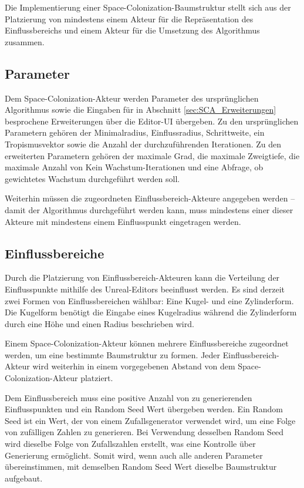 Die Implementierung einer Space-Colonization-Baumstruktur stellt sich aus der Platzierung von mindestens einem Akteur für die Repräsentation des Einflussbereichs und einem Akteur für die Umsetzung des Algorithmus zusammen.

\subsection{Parameter}

Dem Space-Colonization-Akteur werden Parameter des ursprünglichen Algorithmus sowie die Eingaben für in Abschnitt \ref{sec:SCA_Erweiterungen} besprochene Erweiterungen über die Editor-UI übergeben. Zu den ursprünglichen Parametern gehören der Minimalradius, Einflussradius, Schrittweite, ein Tropismusvektor sowie die Anzahl der durchzuführenden Iterationen. Zu den erweiterten Parametern gehören der maximale Grad, die maximale Zweigtiefe, die maximale Anzahl von \glqq Kein Wachstum\grqq{}-Iterationen und eine Abfrage, ob gewichtetes Wachstum durchgeführt werden soll.

Weiterhin müssen die zugeordneten Einflussbereich-Akteure angegeben werden -- damit der Algorithmus durchgeführt werden kann, muss mindestens einer dieser Akteure mit mindestens einem Einflusspunkt eingetragen werden.

\subsection{Einflussbereiche}

Durch die Platzierung von Einflussbereich-Akteuren kann die Verteilung der Einflusspunkte mithilfe des Unreal-Editors beeinflusst werden. Es sind derzeit zwei Formen von Einflussbereichen wählbar: Eine Kugel- und eine Zylinderform. Die Kugelform benötigt die Eingabe eines Kugelradius während die Zylinderform durch eine Höhe und einen Radius beschrieben wird. 

Einem Space-Colonization-Akteur können mehrere Einflussbereiche zugeordnet werden, um eine bestimmte Baumstruktur zu formen. Jeder Einflussbereich-Akteur wird weiterhin in einem vorgegebenen Abstand von dem Space-Colonization-Akteur platziert.

Dem Einflussbereich muss eine positive Anzahl von zu generierenden Einflusspunkten und ein Random Seed Wert übergeben werden. Ein Random Seed ist ein Wert, der von einem Zufallsgenerator verwendet wird, um eine Folge von zufälligen Zahlen zu generieren. Bei Verwendung desselben Random Seed wird dieselbe Folge von Zufallszahlen erstellt, was eine Kontrolle über Generierung ermöglicht. Somit wird, wenn auch alle anderen Parameter übereinstimmen, mit demselben Random Seed Wert dieselbe Baumstruktur aufgebaut. 

